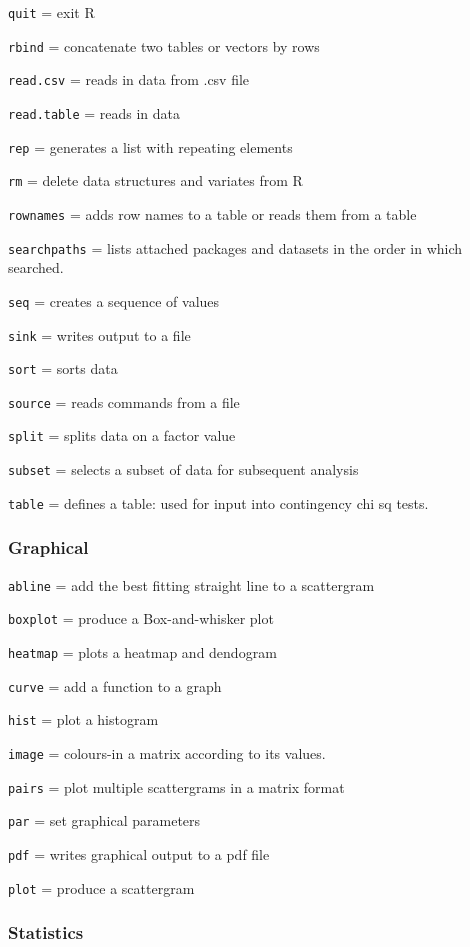 \documentclass[
]{book}
\begin{document}
\texttt{quit} = exit R

\texttt{rbind} = concatenate two tables or vectors by rows

\texttt{read.csv} = reads in data from .csv file

\texttt{read.table} = reads in data

\texttt{rep} = generates a list with repeating elements

\texttt{rm} = delete data structures and variates from R

\texttt{rownames} = adds row names to a table or reads them from a table

\texttt{searchpaths} = lists attached packages and datasets in the order in which
searched.

\texttt{seq} = creates a sequence of values

\texttt{sink} = writes output to a file

\texttt{sort} = sorts data

\texttt{source} = reads commands from a file

\texttt{split} = splits data on a factor value

\texttt{subset} = selects a subset of data for subsequent analysis

\texttt{table} = defines a table: used for input into contingency chi sq tests.

\hypertarget{graphical}{%
\subsubsection{Graphical}\label{graphical}}

\texttt{abline} = add the best fitting straight line to a scattergram

\texttt{boxplot} = produce a Box-and-whisker plot

\texttt{heatmap} = plots a heatmap and dendogram

\texttt{curve} = add a function to a graph

\texttt{hist} = plot a histogram

\texttt{image} = colours-in a matrix according to its values.

\texttt{pairs} = plot multiple scattergrams in a matrix format

\texttt{par} = set graphical parameters

\texttt{pdf} = writes graphical output to a pdf file

\texttt{plot} = produce a scattergram

\hypertarget{statistics}{%
\subsubsection{Statistics}\label{statistics}}
\end{document}
